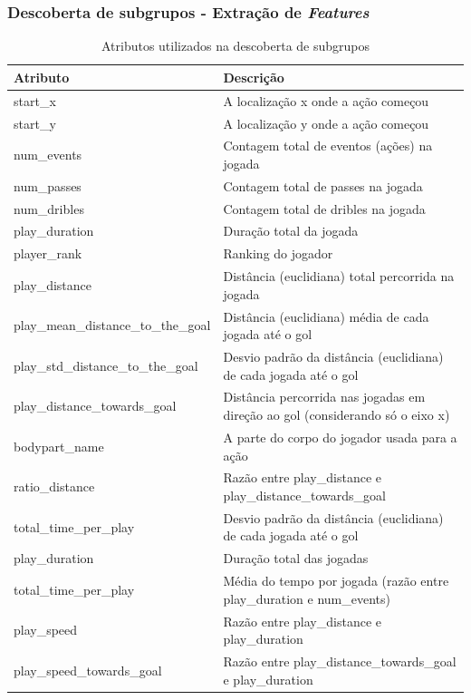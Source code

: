 \documentclass{beamer}
\begin{document}
\begin{frame}
\frametitle{Descoberta de subgrupos - Extração de \textit{Features}}
    \begin{table}[H]
        \centering
        \begin{tabularx}{\textwidth}{|l|X|}
            \hline
            \textbf{Atributo} & \textbf{Descrição} \\
            \hline
            start\_x & A localização x onde a ação começou \\
            \hline
            start\_y & A localização y onde a ação começou \\
            \hline
            num\_events & Contagem total de eventos (ações) na jogada \\
            \hline
            num\_passes & Contagem total de passes na jogada \\
            \hline
            num\_dribles & Contagem total de dribles na jogada \\
            \hline
            play\_duration & Duração total da jogada \\
            \hline
            player\_rank & Ranking do jogador \\
            \hline
            play\_distance & Distância (euclidiana) total percorrida na jogada \\
            \hline
            play\_mean\_distance\_to\_the\_goal & Distância (euclidiana) média de cada jogada até o gol \\
            \hline
            play\_std\_distance\_to\_the\_goal & Desvio padrão da distância (euclidiana) de cada jogada até o gol \\
            \hline
            play\_distance\_towards\_goal & Distância percorrida nas jogadas em direção ao gol (considerando só o eixo x) \\
            \hline
            bodypart\_name & A parte do corpo do jogador usada para a ação \\
            \hline
            ratio\_distance & Razão entre play\_distance e play\_distance\_towards\_goal \\
            \hline
            total\_time\_per\_play & Desvio padrão da distância (euclidiana) de cada jogada até o gol \\
            \hline
            play\_duration & Duração total das jogadas \\
            \hline
            total\_time\_per\_play & Média do tempo por jogada (razão entre play\_duration e num\_events) \\
            \hline
            play\_speed & Razão entre play\_distance e play\_duration \\
            \hline
            play\_speed\_towards\_goal & Razão entre play\_distance\_towards\_goal e play\_duration \\
            \hline
        \end{tabularx}
        \caption{Atributos utilizados na descoberta de subgrupos}
        \label{tab:atributosSD}
    \end{table}
\end{frame}
\end{document}
